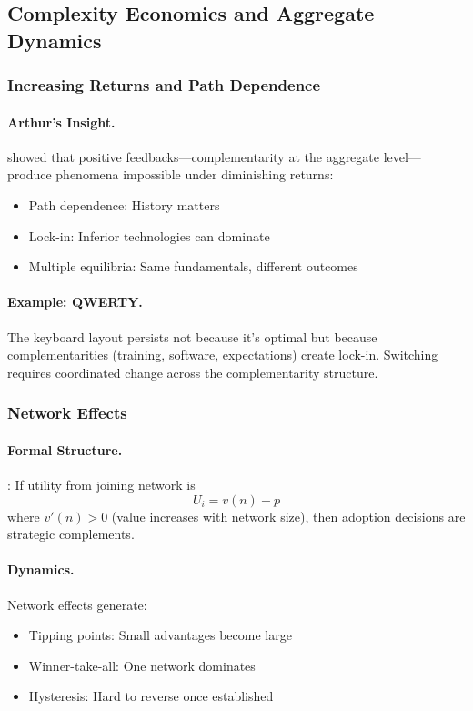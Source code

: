 \subsection{Complexity Economics and Aggregate Dynamics}

\subsubsection{Increasing Returns and Path Dependence}

\paragraph{Arthur's Insight.}
\citet{arthur1989} showed that positive feedbacks---complementarity at the aggregate level---
produce phenomena impossible under diminishing returns:
\begin{itemize}
  \item Path dependence: History matters
  \item Lock-in: Inferior technologies can dominate
  \item Multiple equilibria: Same fundamentals, different outcomes
\end{itemize}

\paragraph{Example: QWERTY.}
The keyboard layout persists not because it's optimal
but because complementarities (training, software, expectations) create lock-in.
Switching requires coordinated change across the complementarity structure.

\subsubsection{Network Effects}

\paragraph{Formal Structure.}
\citet{katzshapiro1985}: If utility from joining network is
\begin{equation}
  U_i = v(n) - p
\end{equation}
where $v'(n) > 0$ (value increases with network size),
then adoption decisions are strategic complements.

\paragraph{Dynamics.}
Network effects generate:
\begin{itemize}
  \item Tipping points: Small advantages become large
  \item Winner-take-all: One network dominates
  \item Hysteresis: Hard to reverse once established
\end{itemize}

